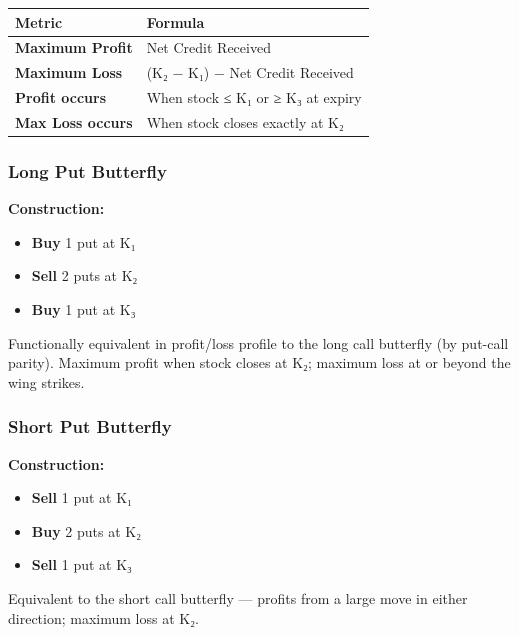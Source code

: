 \documentclass[12pt,openany]{book}
\begin{document}
\begin{center}
\scriptsize
\setlength{\tabcolsep}{3pt}
\begin{tabular}{|L{6.00cm}|L{6.00cm}|}
\hline
Metric & Formula \\
\hline
\textbf{Maximum Profit} & Net Credit Received \\
\hline
\textbf{Maximum Loss} & (K₂ − K₁) − Net Credit Received \\
\hline
\textbf{Profit occurs} & When stock ≤ K₁ or ≥ K₃ at expiry \\
\hline
\textbf{Max Loss occurs} & When stock closes exactly at K₂ \\
\hline
\end{tabular}
\end{center}



\subsubsection{Long Put Butterfly}

\textbf{Construction:}
\begin{itemize}[leftmargin=*]
    \item \textbf{Buy} 1 put at K₁
    \item \textbf{Sell} 2 puts at K₂
    \item \textbf{Buy} 1 put at K₃
\end{itemize}

Functionally equivalent in profit/loss profile to the long call butterfly (by put-call parity). Maximum profit when stock closes at K₂; maximum loss at or beyond the wing strikes.



\subsubsection{Short Put Butterfly}

\textbf{Construction:}
\begin{itemize}[leftmargin=*]
    \item \textbf{Sell} 1 put at K₁
    \item \textbf{Buy} 2 puts at K₂
    \item \textbf{Sell} 1 put at K₃
\end{itemize}

Equivalent to the short call butterfly — profits from a large move in either direction; maximum loss at K₂.
\end{document}
